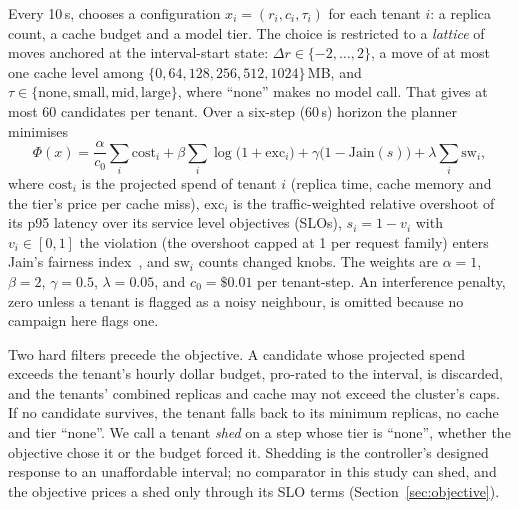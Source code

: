 Every 10\,s, \jcac{} chooses a configuration $x_i=(r_i,c_i,\tau_i)$ for
each tenant $i$: a replica count, a cache budget and a model tier. The
choice is restricted to a \emph{lattice} of moves anchored at the
interval-start state: $\Delta r\in\{-2,\dots,2\}$, a move of at most one
cache level among $\{0,64,128,256,512,1024\}$\,MB, and
$\tau\in\{\text{none},\text{small},\text{mid},\text{large}\}$, where
``none'' makes no model call. That gives at most 60 candidates per tenant.
Over a six-step (60\,s) horizon the planner minimises
\begin{equation}
\label{eq:plan}
\Phi(x)=\frac{\alpha}{c_0}\sum_i \mathrm{cost}_i
 +\beta\sum_i\log\bigl(1+\mathrm{exc}_i\bigr)
 +\gamma\bigl(1-\mathrm{Jain}(s)\bigr)
 +\lambda\sum_i \mathrm{sw}_i ,
\end{equation}
where $\mathrm{cost}_i$ is the projected spend of tenant $i$ (replica time,
cache memory and the tier's price per cache miss), $\mathrm{exc}_i$ is the
traffic-weighted relative overshoot of its p95 latency over its service
level objectives (SLOs), $s_i=1-v_i$ with $v_i\in[0,1]$ the violation (the
overshoot capped at 1 per request family) enters Jain's fairness
index~\cite{jain1984}, and $\mathrm{sw}_i$ counts changed knobs. The weights
are $\alpha=1$, $\beta=2$, $\gamma=0.5$, $\lambda=0.05$, and
$c_0=\$0.01$ per tenant-step. An interference penalty, zero unless a tenant
is flagged as a noisy neighbour, is omitted because no campaign here flags
one.

Two hard filters precede the objective. A candidate whose projected spend
exceeds the tenant's hourly dollar budget, pro-rated to the interval, is
discarded, and the tenants' combined replicas and cache may not exceed the
cluster's caps. If no candidate survives, the tenant falls back to its
minimum replicas, no cache and tier ``none''. We call a tenant
\emph{shed} on a step whose tier is ``none'', whether the objective chose it
or the budget forced it. Shedding is the controller's designed response to
an unaffordable interval; no comparator in this study can shed, and the
objective prices a shed only through its SLO terms
(Section~\ref{sec:objective}).


